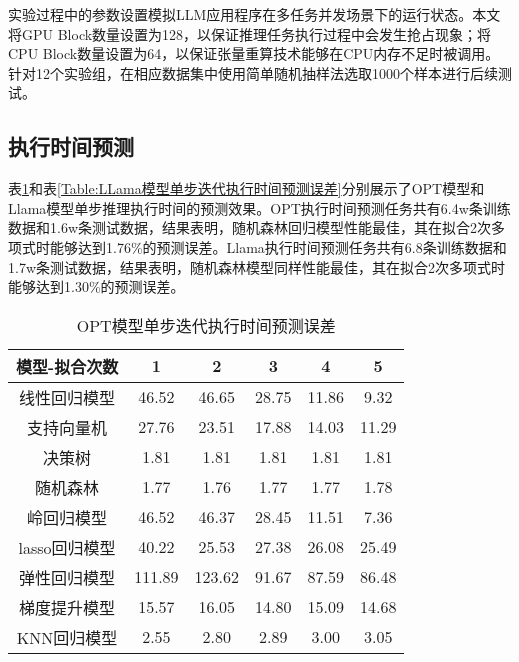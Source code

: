 实验过程中的参数设置模拟LLM应用程序在多任务并发场景下的运行状态。本文将GPU Block数量设置为128，以保证推理任务执行过程中会发生抢占现象；将CPU Block数量设置为64，以保证张量重算技术能够在CPU内存不足时被调用。针对12个实验组，在相应数据集中使用简单随机抽样法选取1000个样本进行后续测试。

\subsection{执行时间预测}

表\ref{Table:OPT模型单步迭代执行时间预测误差}和表\ref{Table:LLama模型单步迭代执行时间预测误差}分别展示了OPT模型和Llama模型单步推理执行时间的预测效果。OPT执行时间预测任务共有6.4w条训练数据和1.6w条测试数据，结果表明，随机森林回归模型性能最佳，其在拟合2次多项式时能够达到1.76\%的预测误差。Llama执行时间预测任务共有6.8条训练数据和1.7w条测试数据，结果表明，随机森林模型同样性能最佳，其在拟合2次多项式时能够达到1.30\%的预测误差。

\begin{table}[H]
  \centering
  \caption{OPT模型单步迭代执行时间预测误差}
  \label{Table:OPT模型单步迭代执行时间预测误差}
  \renewcommand{\arraystretch}{1.25}
  \small
  \begin{tabular}{c c c c c c}
    \toprule
    \textbf{模型-拟合次数} & \textbf{1} & \textbf{2} & \textbf{3} & \textbf{4} & \textbf{5} \\
    \midrule
    线性回归模型 & 46.52 & 46.65 & 28.75 & 11.86 & 9.32 \\ 
    支持向量机 & 27.76 & 23.51 & 17.88 & 14.03 & 11.29 \\
    决策树 & 1.81 & 1.81 & 1.81 & 1.81 & 1.81 \\ 
    随机森林 & 1.77 & 1.76 & 1.77 & 1.77 & 1.78 \\ 
    岭回归模型 & 46.52 & 46.37 & 28.45 & 11.51 & 7.36 \\ 
    lasso回归模型 & 40.22 & 25.53 & 27.38 & 26.08 & 25.49 \\ 
    弹性回归模型 & 111.89 & 123.62 & 91.67 & 87.59 & 86.48 \\ 
    梯度提升模型 & 15.57 & 16.05 & 14.80 & 15.09 & 14.68 \\ 
    KNN回归模型 & 2.55 & 2.80 & 2.89 & 3.00 & 3.05 \\ 
    \bottomrule
  \end{tabular}
\end{table}

